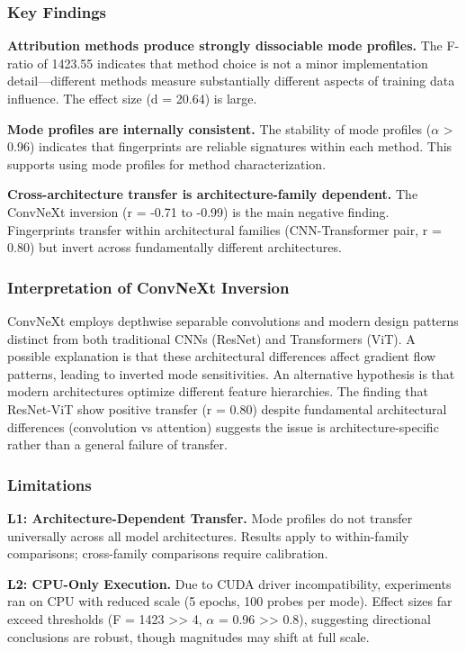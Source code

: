
\subsubsection{Key Findings}

\textbf{Attribution methods produce strongly dissociable mode profiles.} The F-ratio of 1423.55 indicates that method choice is not a minor implementation detail---different methods measure substantially different aspects of training data influence. The effect size (d = 20.64) is large.

\textbf{Mode profiles are internally consistent.} The stability of mode profiles ($\alpha$ > 0.96) indicates that fingerprints are reliable signatures within each method. This supports using mode profiles for method characterization.

\textbf{Cross-architecture transfer is architecture-family dependent.} The ConvNeXt inversion (r = -0.71 to -0.99) is the main negative finding. Fingerprints transfer within architectural families (CNN-Transformer pair, r = 0.80) but invert across fundamentally different architectures.

\subsubsection{Interpretation of ConvNeXt Inversion}

ConvNeXt employs depthwise separable convolutions and modern design patterns distinct from both traditional CNNs (ResNet) and Transformers (ViT). A possible explanation is that these architectural differences affect gradient flow patterns, leading to inverted mode sensitivities. An alternative hypothesis is that modern architectures optimize different feature hierarchies. The finding that ResNet-ViT show positive transfer (r = 0.80) despite fundamental architectural differences (convolution vs attention) suggests the issue is architecture-specific rather than a general failure of transfer.

\subsubsection{Limitations}

\textbf{L1: Architecture-Dependent Transfer.} Mode profiles do not transfer universally across all model architectures. Results apply to within-family comparisons; cross-family comparisons require calibration.

\textbf{L2: CPU-Only Execution.} Due to CUDA driver incompatibility, experiments ran on CPU with reduced scale (5 epochs, 100 probes per mode). Effect sizes far exceed thresholds (F = 1423 >> 4, $\alpha$ = 0.96 >> 0.8), suggesting directional conclusions are robust, though magnitudes may shift at full scale.

